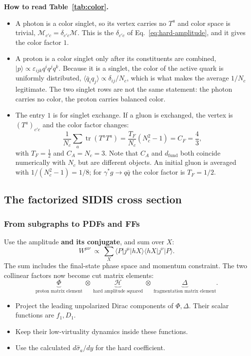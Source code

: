 \documentclass[14pt,a4paper]{extarticle}
\numberwithin{equation}{section}
\newcommand{\M}{\mathcal M}
\begin{document}
\textbf{How to read Table~\ref{tab:color}.}
\begin{itemize}
 \item A photon is a color singlet, so its vertex carries no $T^a$ and color
       space is trivial, $\M_{c'c}=\delta_{c'c}\M$. This is the $\delta_{c'c}$
       of Eq.~\eqref{eq:hard-amplitude}, and it gives the color factor $1$.
 \item A proton is a color singlet only after its constituents are combined,
       $|p\rangle\propto\varepsilon_{ijk}q^iq^jq^k$. Because it is a singlet,
       the color of the active quark is uniformly distributed,
       $\langle\bar q_iq_j\rangle\propto\delta_{ij}/N_c$, which is what makes
       the average $1/N_c$ legitimate. The two singlet rows are not the same
       statement: the photon carries no color, the proton carries balanced
       color.
 \item The entry $1$ is for singlet exchange. If a gluon is exchanged, the
       vertex is $(T^a)_{c'c}$ and the color factor changes:
       \begin{equation}
        \frac{1}{N_c}\sum_{a}\operatorname{tr}(T^aT^a)
        =\frac{T_F}{N_c}\left(N_c^2-1\right)=C_F=\frac43,
        \label{eq:color-casimir}
       \end{equation}
       with $T_F=\tfrac12$ and $C_A=N_c=3$. Note that $C_A$ and
       $d_{\text{fund}}$ both coincide numerically with $N_c$ but are
       different objects. An initial gluon is averaged with
       $1/(N_c^2-1)=1/8$; for $\gamma^*g\to q\bar q$ the color factor is
       $T_F=1/2$.
\end{itemize}

\subsection{The factorized SIDIS cross section}
\label{sec:sidis-factorization}
\subsubsection{From subgraphs to PDFs and FFs}

Use the amplitude \textbf{and its conjugate}, and sum over $X$:
\begin{equation}
 W^{\mu\nu}\ \propto\ \sum_X
 \langle P|j^\mu|hX\rangle\langle hX|j^\nu|P\rangle.
\end{equation}
The sum includes the final-state phase space and momentum constraint.
The two collinear factors now become cut matrix elements:
\begin{equation}
 \underbrace{\Phi}_{\text{proton matrix element}}
 \ \otimes\ \underbrace{\mathcal H}_{\text{hard amplitude squared}}
 \ \otimes\ \underbrace{\Delta}_{\text{fragmentation matrix element}}.
\end{equation}
\begin{itemize}
 \item Project the leading unpolarized Dirac components of $\Phi,\Delta$.
 Their scalar functions are $f_1,D_1$.
 \item Keep their low-virtuality dynamics inside these functions.
 \item Use the calculated $d\hat\sigma_a/dy$ for the hard coefficient.
\end{itemize}
\end{document}
